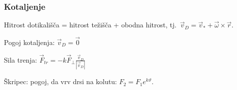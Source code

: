 \documentclass[a4paper,10pt]{article}
\theoremstyle{definition}
\let\theta\vartheta
\newcommand{\vomega}{\vec{\omega}}
\newcommand{\vr}{\vec{r}}
\begin{document}
\subsubsection*{Kotaljenje}
Hitrost dotikališča = hitrost težišča + obodna hitrost, tj.\ $\vec{v}_D =
\vec{v}_* + \vomega \times \vr$.

Pogoj kotaljenja: $\vec{v}_D = \vec{0}$

Sila trenja: $\vec{F}_{tr} = - k \vec{F}_{\bot} \frac{\vec{v}_D}{|\vec{v}_D|}$

Škripec: pogoj, da vrv drsi na kolutu: $F_2 = F_1 e^{k \theta}$.
\end{document}

